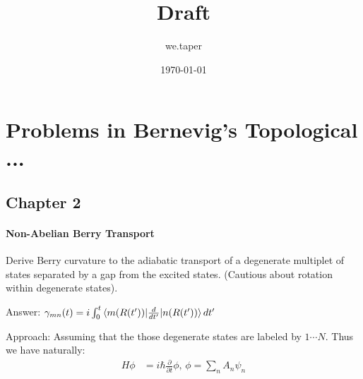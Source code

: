 \documentclass{article}
\title{Draft}
\date{\today}
\author{we.taper}
\numberwithin{equation}{subsection} %
\theoremstyle{definition}
\begin{document}
\maketitle
{}
\tableofcontents

\section{Problems in Bernevig's Topological ...}

    \subsection{Chapter 2}
    \paragraph{Non-Abelian Berry Transport}
    Derive Berry curvature to the adiabatic transport of a degenerate
    multiplet of states separated by a gap from the excited states.
    (Cautious about rotation within degenerate states).

    Answer: $\gamma_{mn}(t) = i \int_0^t \braket{m(R(t'))|\frac{d}{dt'}|n(R(t'))}dt'$

    Approach:
    Assuming that the those degenerate states are labeled by $1\cdots N$. 
    Thus we have naturally:
	\begin{align}
            H\phi &=i\hbar\frac{\partial}{\partial t}\phi\text{,  }
        \phi = \sum_n A_n \psi_n
    \end{align}
    
\end{document}
